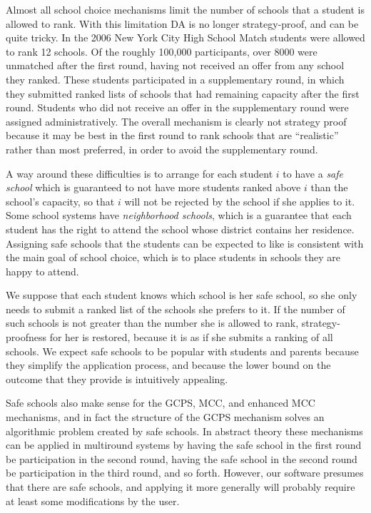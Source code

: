 \documentclass[12pt]{article}
\theoremstyle{definition}
\begin{document}
Almost all school choice mechanisms limit the number of schools that a
student is allowed to rank.  With this limitation DA is no longer
strategy-proof, and can be quite tricky.  In the 2006 New York City
High School Match students were allowed to rank 12 schools.  Of the
roughly 100,000 participants, over 8000 were unmatched after the first
round, having not received an offer from any school they ranked.
These students participated in a supplementary round, in which they
submitted ranked lists of schools that had remaining capacity after
the first round.  Students who did not receive an offer in the
supplementary round were assigned administratively.  The overall
mechanism is clearly not strategy proof because it may be best in the
first round to rank schools that are ``realistic'' rather than most
preferred, in order to avoid the supplementary round.

A way around these difficulties is to arrange for each student $i$ to
have a \emph{safe school} which is guaranteed to not have more
students ranked above $i$ than the school's capacity, so that $i$ will
not be rejected by the school if she applies to it.  Some school
systems have \emph{neighborhood schools}, which is a guarantee that
each student has the right to attend the school whose district
contains her residence.  Assigning safe schools that the students can
be expected to like is consistent with the main goal of school choice,
which is to place students in schools they are happy to attend.

We suppose that each student knows which school is her safe school, so
she only needs to submit a ranked list of the schools she prefers to
it. If the number of such schools is not greater than the number she
is allowed to rank, strategy-proofness for her is restored, because it
is as if she submits a ranking of all schools.  We expect safe schools
to be popular with students and parents because they simplify the
application process, and because the lower bound on the outcome that
they provide is intuitively appealing.

Safe schools also make sense for the GCPS, MCC, and enhanced MCC
mechanisms, and in fact the structure of the GCPS mechanism solves an
algorithmic problem created by safe schools.  In abstract theory these
mechanisms can be applied in multiround systems by having the safe
school in the first round be participation in the second round, having
the safe school in the second round be participation in the third
round, and so forth. However, our software presumes that there are
safe schools, and applying it more generally will probably require
at least some modifications by the user.
\end{document}
